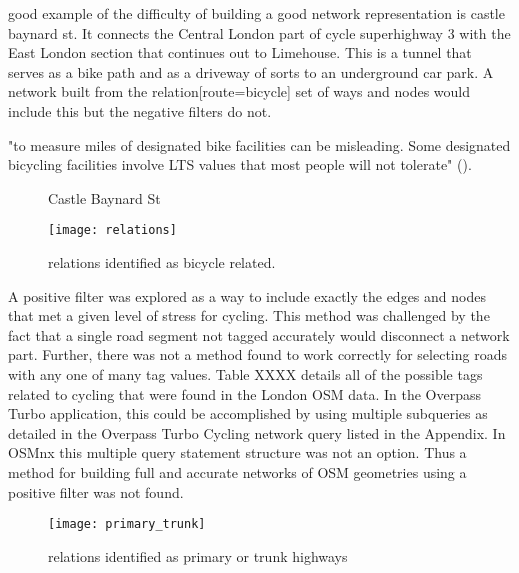 good example of the difficulty of building a good network representation is castle baynard st. It connects the Central London part of cycle superhighway 3 with the East London section that continues out to Limehouse. This is a tunnel that serves as a bike path and as a driveway of sorts to an underground car park. A network built from the relation[route=bicycle] set of ways and nodes would include this but the negative filters do not. 

"to measure miles of designated bike facilities can be misleading. Some designated bicycling facilities involve LTS values that most people will not tolerate" (\cite{furth2016network}).

\begin{figure}
  \centering
  \caption{Castle Baynard St}
  \label{fig:baynard}
\end{figure}

\begin{figure}
\centering
\texttt{[image: relations]}
\caption{relations identified as bicycle related.}
\label{fig:bicycle_relation}
\end{figure}

A positive filter was explored as a way to include exactly the edges and nodes that met a given level of stress for cycling. This method was challenged by the fact that a single road segment not tagged accurately would disconnect a network part. Further, there was not a method found to work correctly for selecting roads with any one of many tag values.  Table XXXX details all of the possible tags related to cycling that were found in the London OSM data.  In the Overpass Turbo application, this could be accomplished by using multiple subqueries as detailed in the Overpass Turbo Cycling network query listed in the Appendix. In OSMnx this multiple query statement structure was not an option. Thus a method for building full and accurate networks of OSM geometries using a positive filter was not found. 




\begin{figure}
\centering
\texttt{[image: primary\_trunk]}
\caption{relations identified as primary or trunk highways}
\label{fig:primary_trunk}
\end{figure}

